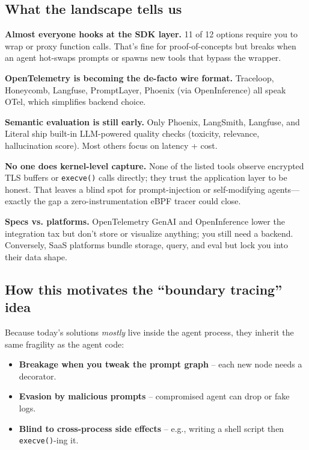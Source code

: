\documentclass[sigplan,screen，review,9pt]{acmart}
\begin{document}
\subsection*{What the landscape tells us}

\textbf{Almost everyone hooks at the SDK layer.} 11 of 12 options require you to wrap or proxy function calls. That’s fine for proof-of-concepts but breaks when an agent hot-swaps prompts or spawns new tools that bypass the wrapper.

\textbf{OpenTelemetry is becoming the de-facto wire format.} Traceloop, Honeycomb, Langfuse, PromptLayer, Phoenix (via OpenInference) all speak OTel, which simplifies backend choice.

\textbf{Semantic evaluation is still early.} Only Phoenix, LangSmith, Langfuse, and Literal ship built-in LLM-powered quality checks (toxicity, relevance, hallucination score). Most others focus on latency + cost.

\textbf{No one does kernel-level capture.} None of the listed tools observe encrypted TLS buffers or \verb|execve()| calls directly; they trust the application layer to be honest. That leaves a blind spot for prompt-injection or self-modifying agents—exactly the gap a zero-instrumentation eBPF tracer could close.

\textbf{Specs vs. platforms.} OpenTelemetry GenAI and OpenInference lower the integration tax but don’t store or visualize anything; you still need a backend. Conversely, SaaS platforms bundle storage, query, and eval but lock you into their data shape.

\subsection*{How this motivates the “boundary tracing” idea}

Because today’s solutions \emph{mostly} live inside the agent process, they inherit the same fragility as the agent code:

\begin{itemize}
  \item \textbf{Breakage when you tweak the prompt graph} – each new node needs a decorator.
  \item \textbf{Evasion by malicious prompts} – compromised agent can drop or fake logs.
  \item \textbf{Blind to cross-process side effects} – e.g., writing a shell script then \verb|execve()|-ing it.
\end{itemize}
\end{document}
